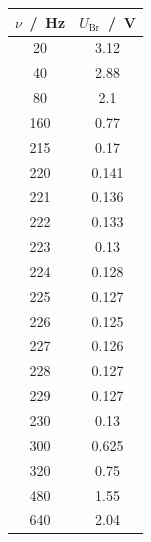 \begin{table}
  \centering
  \begin{tabular}{c c}
    \toprule
    $\nu$ \,/\, \si{\hertz} &
    $U_\text{Br}$ \,/\, \si{\volt} \\
    \midrule
    20  & 3.12  \\
    40  & 2.88  \\
    80  & 2.1   \\
    160 & 0.77  \\
    215 & 0.17  \\
    220 & 0.141 \\
    221 & 0.136 \\
    222 & 0.133 \\
    223 & 0.13  \\
    224 & 0.128 \\
    225 & 0.127 \\
    226 & 0.125 \\
    227 & 0.126 \\
    228 & 0.127 \\
    229 & 0.127 \\
    230 & 0.13  \\
    300 & 0.625 \\
    320 & 0.75  \\
    480 & 1.55  \\
    640 & 2.04  \\
    \bottomrule
  \end{tabular}
\end{table}


